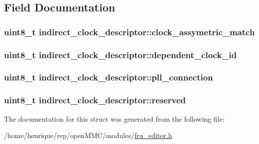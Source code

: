 \subsection{Field Documentation}
\hypertarget{structindirect__clock__descriptor_a1c1b58aa16e331f02e1a5b73e70fd56a}{
\subsubsection[{clock\-\_\-assymetric\-\_\-match}]{\setlength{\rightskip}{0pt plus 5cm}uint8\-\_\-t indirect\-\_\-clock\-\_\-descriptor\-::clock\-\_\-assymetric\-\_\-match}}\label{structindirect__clock__descriptor_a1c1b58aa16e331f02e1a5b73e70fd56a}
\hypertarget{structindirect__clock__descriptor_a886edf185546e65d058d2ae4783ccc32}{
\subsubsection[{dependent\-\_\-clock\-\_\-id}]{\setlength{\rightskip}{0pt plus 5cm}uint8\-\_\-t indirect\-\_\-clock\-\_\-descriptor\-::dependent\-\_\-clock\-\_\-id}}\label{structindirect__clock__descriptor_a886edf185546e65d058d2ae4783ccc32}
\hypertarget{structindirect__clock__descriptor_a97990e59483e54669fe4b852593c3823}{
\subsubsection[{pll\-\_\-connection}]{\setlength{\rightskip}{0pt plus 5cm}uint8\-\_\-t indirect\-\_\-clock\-\_\-descriptor\-::pll\-\_\-connection}}\label{structindirect__clock__descriptor_a97990e59483e54669fe4b852593c3823}
\hypertarget{structindirect__clock__descriptor_a0328cc660ee6c195839c685fe5bf3635}{
\subsubsection[{reserved}]{\setlength{\rightskip}{0pt plus 5cm}uint8\-\_\-t indirect\-\_\-clock\-\_\-descriptor\-::reserved}}\label{structindirect__clock__descriptor_a0328cc660ee6c195839c685fe5bf3635}


The documentation for this struct was generated from the following file\-:\begin{DoxyCompactItemize}
\item 
/home/henrique/rep/open\-M\-M\-C/modules/\hyperlink{fru__editor_8h}{fru\-\_\-editor.\-h}\end{DoxyCompactItemize}
